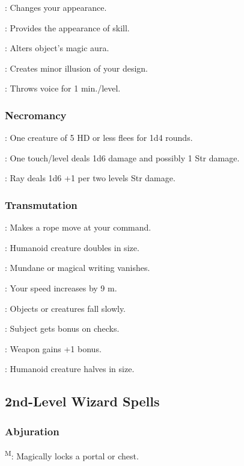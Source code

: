 	: Changes your appearance.

	: Provides the appearance of skill. %

	: Alters object's magic aura.

	: Creates minor illusion of your design.

	: Throws voice for 1 min./level.

\subsubsection{Necromancy}
	: One creature of 5 HD or less flees for 1d4 rounds.

	: One touch/level deals 1d6 damage and possibly 1 Str damage.

	: Ray deals 1d6 +1 per two levels Str damage.

\subsubsection{Transmutation}
	: Makes a rope move at your command.

	: Humanoid creature doubles in size.

	: Mundane or magical writing vanishes.

	: Your speed increases by 9 m.

	: Objects or creatures fall slowly.

	: Subject gets bonus on  checks.

	: Weapon gains +1 bonus.

	: Humanoid creature halves in size.



\subsection{2nd-Level Wizard Spells}

\subsubsection{Abjuration}
	\textsuperscript{M}: Magically locks a portal or chest.

